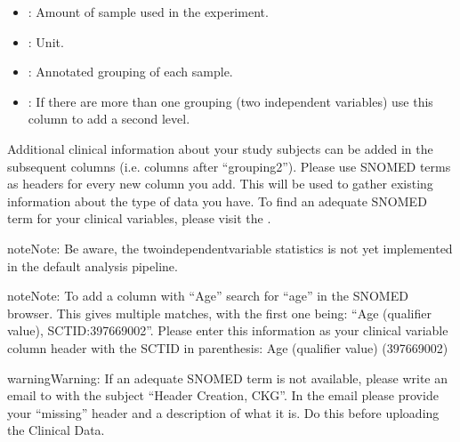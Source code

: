 \documentclass[letterpaper,10pt,english]{sphinxmanual}
\begin{document}
\begin{itemize}
\item {} 
: Amount of sample used in the experiment.

\item {} 
: Unit.

\item {} 
: Annotated grouping of each sample.

\item {} 
: If there are more than one grouping (two independent variables) use this column to add a second level.

\end{itemize}

Additional clinical information about your study subjects can be added in the subsequent columns (i.e. columns after “grouping2”).
Please use SNOMED terms as headers for every new column you add. This will be used to gather existing information about the type of data you have.
To find an adequate SNOMED term for your clinical variables, please visit the .

\begin{sphinxadmonition}{note}{Note:}
Be aware, the two\sphinxhyphen{}independent\sphinxhyphen{}variable statistics is not yet implemented in the default analysis pipeline.
\end{sphinxadmonition}

\begin{sphinxadmonition}{note}{Note:}
To add a column with “Age” search for “age” in the SNOMED browser. This gives multiple matches, with the first one being: “Age (qualifier value), SCTID:397669002”. Please enter this information as your clinical variable column header with the SCTID in parenthesis: Age (qualifier value) (397669002)
\end{sphinxadmonition}

\begin{sphinxadmonition}{warning}{Warning:}
If an adequate SNOMED term is not available, please write an e\sphinxhyphen{}mail to  with the subject “Header Creation, CKG”. In the email please provide your “missing” header and a description of what it is. Do this before uploading the Clinical Data.
\end{sphinxadmonition}
\end{document}
